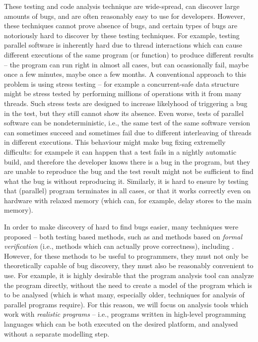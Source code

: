 These testing and code analysis technique are wide-spread, can discover large amounts of bugs, and are often reasonably easy to use for developers.
However, these techniques cannot prove absence of bugs, and certain types of bugs are notoriously hard to discover by these testing techniques.
For example, testing parallel software is inherently hard due to thread interactions which can cause different executions of the same program (or function) to produce different results -- the program can run right in almost all cases, but can ocassionally fail, maybe once a few minutes, maybe once a few months.
A conventional approach to this problem is using stress testing -- for example a concurrent-safe data structure might be stress tested by performing millions of operations with it from many threads.
Such stress tests are designed to increase likelyhood of triggering a bug in the test, but they still cannot show its absence.
Even worse, tests of parallel software can be nondeterministic, i.e., the same test of the same software version can sometimes succeed and sometimes fail due to different interleaving of threads in different executions.
This behaviour might make bug fixing extremelly difficults: for exampele it can happen that a test fails in a nightly automatic build, and therefore the developer knows there is a bug in the program, but they are unable to reproduce the bug and the test result might not be sufficient to find what the bug is without reproducing it.
Similarly, it is hard to ensure by testing that (parallel) program terminates in all cases, or that it works correctly even on hardware with relaxed memory (which can, for example, delay stores to the main memory).

In order to make discovery of hard to find bugs easier, many techniques were proposed -- both testing based methods, such as  and methods based on \emph{formal verification} (i.e., methods which can actually prove correctness), including .
However, for these methods to be useful to programmers, they must not only be theoretically capable of bug discovery, they must also be reasonably convenient to use.
For example, it is highly desirable that the program analysis tool can analyze the program directly, without the need to create a model of the program which is to be analysed (which is what many, especially older, techniques for analysis of parallel programs require).
For this reason, we will focus on analysis tools which work with \emph{realistic programs} -- i.e., programs written in high-level programming languages which can be both executed on the desired platform, and analysed without a separate modelling step.


